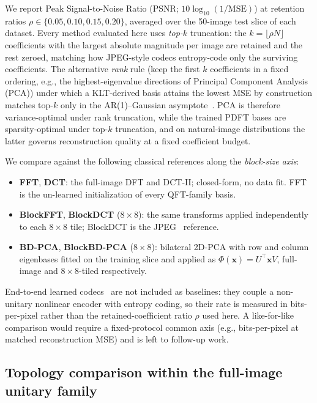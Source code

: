 \documentclass[a4paper, twocolumn]{quantumarticle}
\newcommand{\eg}{e.g.,\xspace}
\begin{document}
We report Peak Signal-to-Noise Ratio (PSNR; $10 \log_{10}(1/\text{MSE})$) at retention ratios $\rho \in \{0.05, 0.10, 0.15, 0.20\}$, averaged over the 50-image test slice of each dataset.
Every method evaluated here uses \emph{top-$k$} truncation: the $k = \lfloor \rho N \rfloor$ coefficients with the largest absolute magnitude per image are retained and the rest zeroed, matching how JPEG-style codecs entropy-code only the surviving coefficients.
The alternative \emph{rank} rule (keep the first $k$ coefficients in a fixed ordering, \eg the highest-eigenvalue directions of Principal Component Analysis (PCA)) under which a KLT-derived basis attains the lowest MSE by construction matches top-$k$ only in the AR(1)--Gaussian asymptote~\cite{effros2004suboptimality}.
PCA is therefore variance-optimal under rank truncation, while the trained PDFT bases are sparsity-optimal under top-$k$ truncation, and on natural-image distributions the latter governs reconstruction quality at a fixed coefficient budget.

We compare against the following classical references along the \emph{block-size axis}:
\begin{itemize}
  \item \textbf{FFT}, \textbf{DCT}: the full-image DFT and DCT-II; closed-form, no data fit. FFT is the un-learned initialization of every QFT-family basis.
  \item \textbf{BlockFFT}, \textbf{BlockDCT} ($8 \times 8$): the same transforms applied independently to each $8 \times 8$ tile; BlockDCT is the JPEG~\cite{wallace1992jpeg} reference.
  \item \textbf{BD-PCA}, \textbf{BlockBD-PCA} ($8 \times 8$): bilateral 2D-PCA with row and column eigenbases fitted on the training slice and applied as $\Phi(\mathbf{x}) = U^\top \mathbf{x} V$, full-image and $8 \times 8$-tiled respectively.
\end{itemize}

End-to-end learned codecs~\cite{balle2017end, theis2017} are not included as baselines: they couple a non-unitary nonlinear encoder with entropy coding, so their rate is measured in bits-per-pixel rather than the retained-coefficient ratio $\rho$ used here.
A like-for-like comparison would require a fixed-protocol common axis (e.g., bits-per-pixel at matched reconstruction MSE) and is left to follow-up work.

\subsection{Topology comparison within the full-image unitary family}
\label{sec:topology_div2k}
\end{document}
